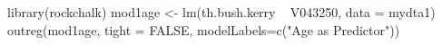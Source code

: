 \begin{Schunk}
\begin{Sinput}
 library(rockchalk)
 mod1age <- lm(th.bush.kerry ~ V043250, data = mydta1)
 outreg(mod1age, tight = FALSE, modelLabels=c("Age as Predictor"))
\end{Sinput}
\end{Schunk}
